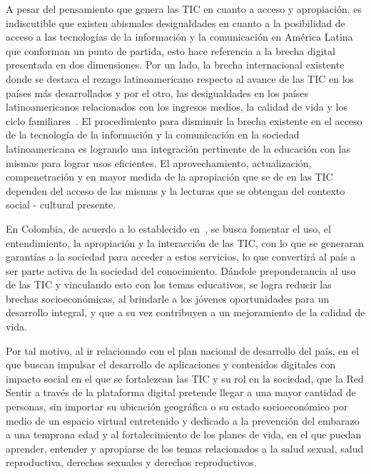 \documentclass[journal,transmag]{IEEEtran}
\begin{document}
A pesar del pensamiento que genera las TIC en cuanto a acceso y apropiación, es indiscutible que existen abismales desigualdades en cuanto a la posibilidad de acceso a las tecnologías de la información y la comunicación en América Latina que conforman un punto de partida, esto hace referencia a la brecha digital presentada en dos dimensiones. Por un lado, la brecha internacional existente donde se destaca el rezago latinoamericano respecto al avance de las TIC en los países más desarrollados y por el otro, las desigualdades en los países latinoamericanos relacionados con los ingresos medios, la calidad de vida y los ciclo familiares~\cite{Sunkel2006}. El procedimiento para disminuir la brecha existente en el acceso de la tecnología de la información y la comunicación en la sociedad latinoamericana es logrando una integración pertinente de la educación con las mismas para lograr usos eficientes. El aprovechamiento, actualización, compenetración y en mayor medida de la apropiación que se de en las TIC dependen del acceso de las mismas y la lecturas que se obtengan del contexto social - cultural presente.

En Colombia, de acuerdo a lo establecido en~\cite{Plan2014}, se busca fomentar el uso, el entendimiento, la apropiación y la interacción de las TIC, con lo que se generaran garantías a la sociedad para acceder a estos servicios, lo que convertirá al país a ser parte activa de la sociedad del conocimiento. Dándole preponderancia al uso de las TIC y vinculando esto con los temas educativos, se logra reducir las brechas socioeconómicas, al brindarle a los jóvenes oportunidades para un desarrollo integral, y que a su vez contribuyen a un mejoramiento de la calidad de vida.

Por tal motivo, al ir relacionado con el plan nacional de desarrollo del país, en el que buscan impulsar el desarrollo de aplicaciones y contenidos digitales con impacto social en el que se fortalezcan las TIC y su rol en la sociedad, que la Red Sentir a través de la plataforma digital pretende llegar a una mayor cantidad de personas, sin importar su ubicación geográfica o su estado socioeconómico por medio de un espacio virtual entretenido y dedicado a la prevención del embarazo a una temprana edad y al fortalecimiento de los planes de vida, en el que puedan aprender, entender y apropiarse de los temas relacionados a la salud sexual, salud reproductiva, derechos sexuales y derechos reproductivos.
\end{document}
